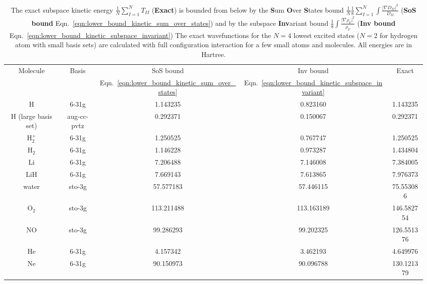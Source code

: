 

\begin{table}
\begin{tabular}{
  SSSSS
  }
    \toprule
 {Molecule} & {Basis} & {SoS bound} & {Inv bound} & {Exact}\\
 & &  {Eqn.~\ref{eqn:lower_bound_kinetic_sum_over_states}} & {Eqn.~\ref{eqn:lower_bound_kinetic_subspace_invariant}} & \\
\midrule
{H} & {6-31g} & 1.143235 & 0.823160 & 1.143235 \\
{H (large basis set)} & {aug-cc-pvtz} & 0.292371 & 0.150067 & 0.292371 \\
{H$_2^+$} & {6-31g} & 1.250525 & 0.767747 & 1.250525 \\
{H$_2$} & {6-31g} & 1.146228 & 0.973287 & 1.434804 \\
{Li} & {6-31g} & 7.206488 & 7.146008 & 7.384005 \\
{LiH} & {6-31g} & 7.669143 & 7.613865 & 7.976373 \\
{water} & {sto-3g} & 57.577183 & 57.446115 & 75.553086 \\
{O$_2$} & {sto-3g} & 113.211488 & 113.163189 & 146.582754 \\
{NO} & {sto-3g} & 99.286293 & 99.202325 & 126.551376 \\
{He} & {6-31g} & 4.157342 & 3.462193 & 4.649976 \\
{Ne} & {6-31g} & 90.150973 & 90.096788 & 130.121379 \\
\bottomrule
\end{tabular}

\caption{
\label{tbl:lower_bounds_kinetic_energy}
\normalfont
The exact subspace kinetic energy $\frac{1}{N} \sum_{I=1}^{N} T_{II}$ (\textbf{Exact}) is bounded from below by
the \textbf{S}um \textbf{O}ver \textbf{S}tates bound $\frac{1}{N} \frac{1}{8} \sum_{I=1}^{N} \int \frac{\vert \nabla D_{II} \vert^2}{D_{II}}$
(\textbf{SoS bound} Eqn.~\ref{eqn:lower_bound_kinetic_sum_over_states}) and by the subspace \textbf{Inv}ariant bound
$\frac{1}{8} \int \frac{\vert \nabla \rho_V \vert^2}{\rho_V}$
(\textbf{Inv bound} Eqn.~\ref{eqn:lower_bound_kinetic_subspace_invariant})
The exact wavefunctions for the $N=4$ lowest excited states ($N=2$ for hydrogen atom with small basis sets)
are calculated with full configuration interaction for a few small atoms and molecules.
All energies are in Hartree.}
\end{table}
    
